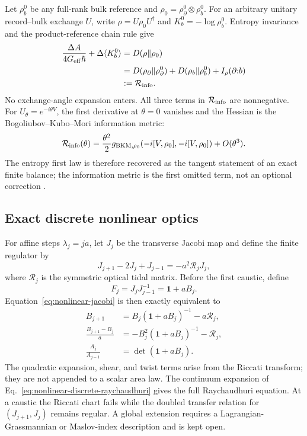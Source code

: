 Let \(\rho_b^0\) be any full-rank bulk reference and
\(\rho_0=\rho_{\partial}^0\otimes\rho_b^0\).  For an arbitrary unitary
record--bulk exchange \(U\), write
\(\rho=U\rho_0U^\dagger\) and
\(K_b^0=-\log\rho_b^0\).  Entropy invariance and the product-reference
chain rule give
\begin{align}
 \frac{\Delta A}{4G_{\rm eff}\hbar}
 +\Delta\langle K_b^0\rangle
 &=D(\rho\Vert\rho_0)\nonumber\\
 &=D(\rho_{\partial}\Vert\rho_{\partial}^0)
 +D(\rho_b\Vert\rho_b^0)
 +I_\rho(\partial{:}b)\nonumber\\
 &:=\mathcal R_{\rm info}.
 \label{eq:nonlinear-finite-information}
\end{align}
No exchange-angle expansion enters.  All three terms in
\(\mathcal R_{\rm info}\) are nonnegative.  For
\(U_\theta=e^{-i\theta V}\), the first derivative at \(\theta=0\) vanishes
and the Hessian is the Bogoliubov--Kubo--Mori information metric:
\begin{equation}
 \mathcal R_{\rm info}(\theta)
 =\frac{\theta^2}{2}
 g_{\rm BKM,\rho_0}
 \!\left(-i[V,\rho_0],-i[V,\rho_0]\right)+O(\theta^3).
 \label{eq:nonlinear-bkm}
\end{equation}
The entropy first law is therefore recovered as the tangent statement of an
exact finite balance; the information metric is the first omitted term, not
an optional correction \cite{Petz1996,Lashkari2016}.

\subsection{Exact discrete nonlinear optics}

For affine steps \(\lambda_j=ja\), let \(J_j\) be the transverse Jacobi map
and define the finite regulator by
\begin{equation}
 J_{j+1}-2J_j+J_{j-1}=-a^2\mathcal R_jJ_j ,
 \label{eq:nonlinear-jacobi}
\end{equation}
where \(\mathcal R_j\) is the symmetric optical tidal matrix.  Before the
first caustic, define
\begin{equation}
 F_j=J_jJ_{j-1}^{-1}=\mathbf1+aB_j .
\end{equation}
Equation~\eqref{eq:nonlinear-jacobi} is then exactly equivalent to
\begin{align}
 B_{j+1}
 &=B_j(\mathbf1+aB_j)^{-1}-a\mathcal R_j,
 \label{eq:nonlinear-riccati}\\
 \frac{B_{j+1}-B_j}{a}
 &=-B_j^2(\mathbf1+aB_j)^{-1}-\mathcal R_j ,
 \label{eq:nonlinear-discrete-raychaudhuri}\\
 \frac{A_j}{A_{j-1}}
 &=\det(\mathbf1+aB_j).
 \label{eq:nonlinear-area-update}
\end{align}
The quadratic expansion, shear, and twist terms arise from the Riccati
transform; they are not appended to a scalar area law.  The continuum
expansion of Eq.~\eqref{eq:nonlinear-discrete-raychaudhuri} gives the full
Raychaudhuri equation.  At a caustic the Riccati chart fails while the doubled
transfer relation for \((J_{j+1},J_j)\) remains regular.  A global extension
requires a Lagrangian-Grassmannian or Maslov-index description and is kept
open.

